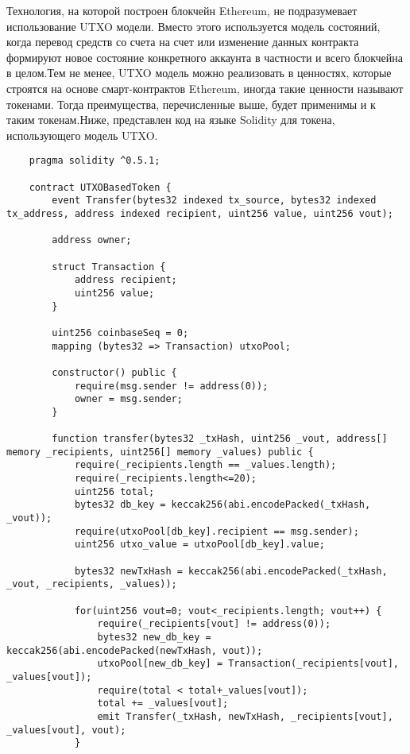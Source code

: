 Технология, на которой построен блокчейн Ethereum, не подразумевает использование UTXO модели. Вместо этого используется модель состояний, когда перевод средств со счета на счет или изменение данных контракта формируют новое состояние конкретного аккаунта в частности и всего блокчейна в целом.Тем не менее, UTXO модель можно реализовать в ценностях, которые строятся на основе смарт-контрактов Ethereum, иногда такие ценности называют токенами. Тогда преимущества, перечисленные выше, будет применимы и к таким токенам.Ниже, представлен код на языке Solidity для токена, использующего модель UTXO.

\begin{verbatim}
    pragma solidity ^0.5.1;

    contract UTXOBasedToken {
        event Transfer(bytes32 indexed tx_source, bytes32 indexed tx_address, address indexed recipient, uint256 value, uint256 vout);
    
        address owner;
    
        struct Transaction {
            address recipient;
            uint256 value;
        }
    
        uint256 coinbaseSeq = 0;
        mapping (bytes32 => Transaction) utxoPool;
        
        constructor() public {
            require(msg.sender != address(0));
            owner = msg.sender;
        }
    
        function transfer(bytes32 _txHash, uint256 _vout, address[] memory _recipients, uint256[] memory _values) public {
            require(_recipients.length == _values.length);
            require(_recipients.length<=20);
            uint256 total;
            bytes32 db_key = keccak256(abi.encodePacked(_txHash, _vout));
            require(utxoPool[db_key].recipient == msg.sender);
            uint256 utxo_value = utxoPool[db_key].value;
    
            bytes32 newTxHash = keccak256(abi.encodePacked(_txHash, _vout, _recipients, _values));
    
            for(uint256 vout=0; vout<_recipients.length; vout++) {
                require(_recipients[vout] != address(0));
                bytes32 new_db_key = keccak256(abi.encodePacked(newTxHash, vout));
                utxoPool[new_db_key] = Transaction(_recipients[vout], _values[vout]);
                require(total < total+_values[vout]);
                total += _values[vout];
                emit Transfer(_txHash, newTxHash, _recipients[vout], _values[vout], vout);
            }
    

\end{verbatim}
